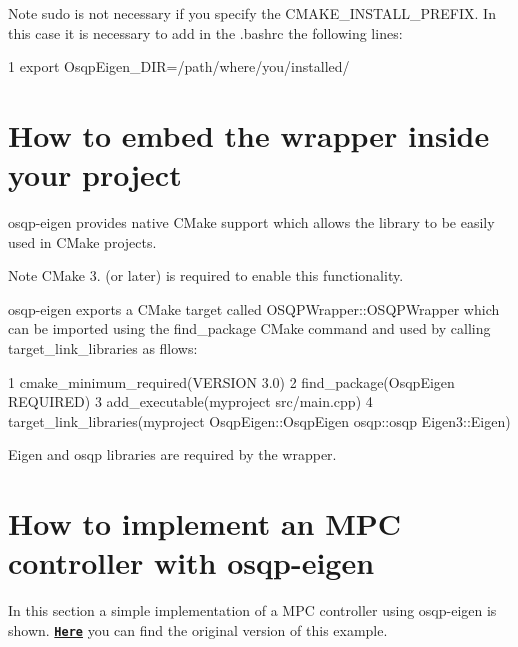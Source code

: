 \begin{DoxyNote}{Note}
{\ttfamily sudo} is not necessary if you specify the {\ttfamily C\+M\+A\+K\+E\+\_\+\+I\+N\+S\+T\+A\+L\+L\+\_\+\+P\+R\+E\+F\+IX}. In this case it is necessary to add in the {\ttfamily .bashrc} the following lines\+: 
\begin{DoxyCode}
1 export OsqpEigen\_DIR=/path/where/you/installed/
\end{DoxyCode}

\end{DoxyNote}
\hypertarget{index_use-section}{}\section{How to embed the wrapper inside your project}\label{index_use-section}
osqp-\/eigen provides native C\+Make support which allows the library to be easily used in C\+Make projects. \begin{DoxyNote}{Note}
C\+Make 3. (or later) is required to enable this functionality.
\end{DoxyNote}
osqp-\/eigen exports a C\+Make target called {\ttfamily O\+S\+Q\+P\+Wrapper\+::\+O\+S\+Q\+P\+Wrapper} which can be imported using the {\ttfamily find\+\_\+package} C\+Make command and used by calling {\ttfamily target\+\_\+link\+\_\+libraries} as fllows\+: 
\begin{DoxyCode}
1 cmake\_minimum\_required(VERSION 3.0)
2 find\_package(OsqpEigen REQUIRED)
3 add\_executable(myproject src/main.cpp)
4 target\_link\_libraries(myproject OsqpEigen::OsqpEigen osqp::osqp Eigen3::Eigen)
\end{DoxyCode}
 Eigen and osqp libraries are required by the wrapper.\hypertarget{index_example-section}{}\section{How to implement an M\+P\+C controller with osqp-\/eigen}\label{index_example-section}
In this section a simple implementation of a M\+PC controller using osqp-\/eigen is shown. \href{http://osqp.readthedocs.io/en/latest/examples/mpc.html}{\tt {\bfseries Here}} you can find the original version of this example.

